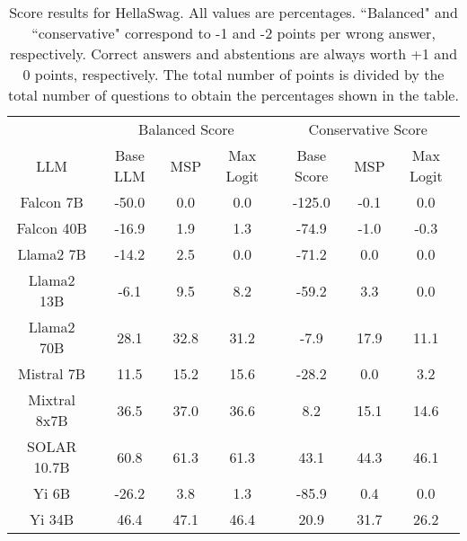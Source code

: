 \renewcommand\arraystretch{1.2}
\begin{table*}
\centering
\begin{tabular}{c|c|c|c|c|c|c}
& \multicolumn{3}{c|}{Balanced Score} & \multicolumn{3}{c}{Conservative Score} \\ 
LLM & Base LLM & MSP & Max Logit & Base Score & MSP & Max Logit\\ \hline
Falcon 7B & -50.0 & 0.0 & 0.0 & -125.0 & -0.1 & 0.0\\
Falcon 40B & -16.9 & 1.9 & 1.3 & -74.9 & -1.0 & -0.3\\
Llama2 7B & -14.2 & 2.5 & 0.0 & -71.2 & 0.0 & 0.0\\
Llama2 13B & -6.1 & 9.5 & 8.2 & -59.2 & 3.3 & 0.0\\
Llama2 70B & 28.1 & 32.8 & 31.2 & -7.9 & 17.9 & 11.1\\
Mistral 7B & 11.5 & 15.2 & 15.6 & -28.2 & 0.0 & 3.2\\
Mixtral 8x7B & 36.5 & 37.0 & 36.6 & 8.2 & 15.1 & 14.6\\
SOLAR 10.7B & 60.8 & 61.3 & 61.3 & 43.1 & 44.3 & 46.1\\
Yi 6B & -26.2 & 3.8 & 1.3 & -85.9 & 0.4 & 0.0\\
Yi 34B & 46.4 & 47.1 & 46.4 & 20.9 & 31.7 & 26.2\\
\hline
\end{tabular}
\caption{Score results for HellaSwag. All values are percentages. ``Balanced" and ``conservative" correspond to -1 and -2 points per wrong answer, respectively. Correct answers and abstentions are always worth +1 and 0 points, respectively. The total number of points is divided by the total number of questions to obtain the percentages shown in the table.}
\label{tab:hellaswag_score}
\end{table*}
